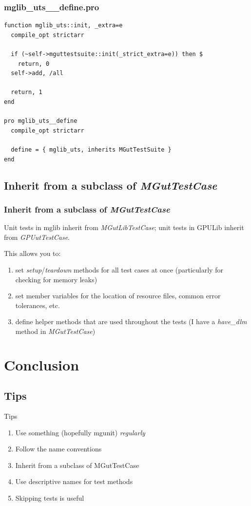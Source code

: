 \documentclass[12pt, handout]{beamer}
\begin{document}
\begin{frame}[fragile]
  \frametitle{mglib\_uts\_\_define.pro}
\begin{lstlisting}[basicstyle=\ttfamily\fontsize{10pt}{10pt}\selectfont]
function mglib_uts::init, _extra=e
  compile_opt strictarr

  if (~self->mguttestsuite::init(_strict_extra=e)) then $
    return, 0
  self->add, /all

  return, 1
end

pro mglib_uts__define
  compile_opt strictarr

  define = { mglib_uts, inherits MGutTestSuite }
end
\end{lstlisting}
\end{frame}

\subsection{Inherit from a subclass of {\em MGutTestCase}}

\begin{frame}
  \frametitle{Inherit from a subclass of {\em MGutTestCase}}
Unit tests in mglib inherit from {\em MGutLibTestCase}; unit tests in GPULib inherit from {\em GPUutTestCase}.

This allows you to:
\begin{enumerate}
  \item set {\em setup}/{\em teardown} methods for all test cases at once (particularly for checking for memory leaks)
  \item set member variables for the location of resource files, common error tolerances, etc.
  \item define helper methods that are used throughout the tests (I have a {\em have\_dlm} method in {\em MGutTestCase})
\end{enumerate}
\end{frame}

\section{Conclusion}

\subsection{Tips}
\begin{frame}[t]{Tips}
  \begin{enumerate}
    \item Use something (hopefully mgunit) {\em regularly}
    \item Follow the name conventions
    \item Inherit from a subclass of MGutTestCase
    \item Use descriptive names for test methods
    \item Skipping tests is useful
  \end{enumerate}
\end{frame}
\end{document}
